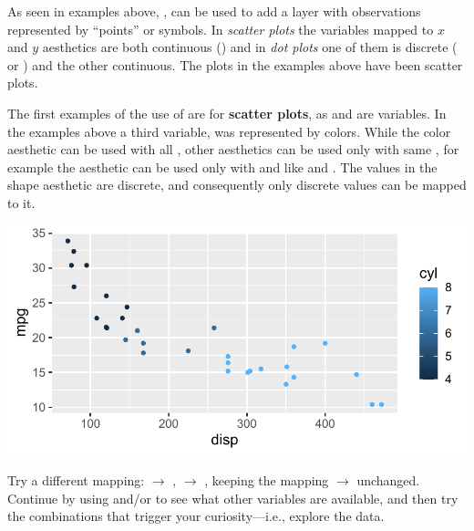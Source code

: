 \documentclass[krantz2]{krantz}\usepackage{knitr}
\begin{document}
As seen in examples above, , can be used to add a layer with observations represented by ``points'' or symbols. In \emph{scatter plots} the variables mapped to $x$ and $y$ aesthetics are both continuous () and in \emph{dot plots} one of them is discrete ( or ) and the other continuous. The plots in the examples above have been scatter plots.

The first examples of the use of  are for \textbf{scatter plots}, as  and  are  variables. In the examples above a third variable,  was represented by colors. While the color aesthetic can be used with all , other aesthetics can be used only with same , for example the  aesthetic can be used only with  and  like  and . The values in the shape aesthetic are discrete, and consequently only discrete values can be mapped to it.

\begin{knitrout}\footnotesize
{}\color{fgcolor}\begin{kframe}
\begin{alltt}
 \hlkwb{<-}
  \hlstd{(} 
        \hlstd{=} \hlstd{(}     \hlstd{=}  \hlopt{+}
  \hlstd{()}
\end{alltt}
\end{kframe}

{\centering \includegraphics[width=.7\textwidth]{figure/pos-scatter-01-1} 

}


\end{knitrout}

\begin{playground}
Try a different mapping:  $\rightarrow$ ,  $\rightarrow$ , keeping the mapping   $\rightarrow$  unchanged. Continue by using  and/or  to see what other variables are available, and then try the combinations that trigger your curiosity---i.e., explore the data.
\end{playground}
\end{document}

